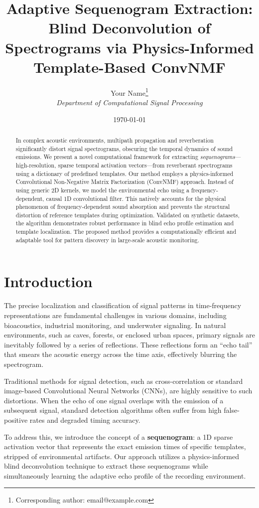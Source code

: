 \documentclass[11pt,a4paper]{article}
\title{\textbf{Adaptive Sequenogram Extraction: Blind Deconvolution of Spectrograms via Physics-Informed Template-Based ConvNMF}}
\author{Your Name\thanks{Corresponding author: email@example.com} \\ 
        \small \textit{Department of Computational Signal Processing}}
\date{\today}
\begin{document}
\maketitle

\begin{abstract}
In complex acoustic environments, multipath propagation and reverberation significantly distort signal spectrograms, obscuring the temporal dynamics of sound emissions. We present a novel computational framework for extracting \textit{sequenograms}—high-resolution, sparse temporal activation vectors—from reverberant spectrograms using a dictionary of predefined templates. Our method employs a physics-informed Convolutional Non-Negative Matrix Factorization (ConvNMF) approach. Instead of using generic 2D kernels, we model the environmental echo using a frequency-dependent, causal 1D convolutional filter. This natively accounts for the physical phenomenon of frequency-dependent sound absorption and prevents the structural distortion of reference templates during optimization. Validated on synthetic datasets, the algorithm demonstrates robust performance in blind echo profile estimation and template localization. The proposed method provides a computationally efficient and adaptable tool for pattern discovery in large-scale acoustic monitoring.
\end{abstract}

\section{Introduction}
The precise localization and classification of signal patterns in time-frequency representations are fundamental challenges in various domains, including bioacoustics, industrial monitoring, and underwater signaling. In natural environments, such as caves, forests, or enclosed urban spaces, primary signals are inevitably followed by a series of reflections. These reflections form an ``echo tail'' that smears the acoustic energy across the time axis, effectively blurring the spectrogram. 

Traditional methods for signal detection, such as cross-correlation or standard image-based Convolutional Neural Networks (CNNs), are highly sensitive to such distortions. When the echo of one signal overlaps with the emission of a subsequent signal, standard detection algorithms often suffer from high false-positive rates and degraded timing accuracy.

To address this, we introduce the concept of a \textbf{sequenogram}: a 1D sparse activation vector that represents the exact emission times of specific templates, stripped of environmental artifacts. Our approach utilizes a physics-informed blind deconvolution technique to extract these sequenograms while simultaneously learning the adaptive echo profile of the recording environment.
\end{document}
